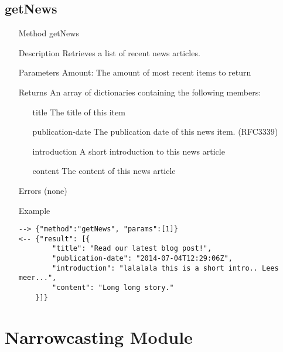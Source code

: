 \documentclass[a4paper]{scrreprt}
\begin{document}
\clearpage

\subsection{getNews}
\begin{enumerate}
\item[Method] getNews
\item[Description] Retrieves a list of recent news articles.
\item[Parameters] 
	Amount: The amount of most recent items to return
\item[Returns] An array of dictionaries containing the following members:
\begin{enumerate}
    \item[title] The title of this item
	\item[publication-date] The publication date of this news item. (RFC3339)
    \item[introduction] A short introduction to this news article
    \item[content] The content of this news article
	\end{enumerate}
\item[Errors] (none)
\item[Example]
\begin{lstlisting}
--> {"method":"getNews", "params":[1]}
<-- {"result": [{
        "title": "Read our latest blog post!", 
        "publication-date": "2014-07-04T12:29:06Z", 
        "introduction": "lalalala this is a short intro.. Lees meer...", 
        "content": "Long long story." 
    }]}
\end{lstlisting}
\end{enumerate}

\section{Narrowcasting Module}
\end{document}
